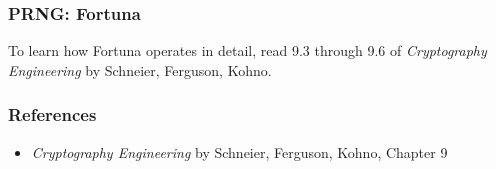 \documentclass{beamer}
\newcommand{\<}{\langle}
\renewcommand{\>}{\rangle}
\begin{document}
\begin{frame}
\frametitle{PRNG: Fortuna}

To learn how Fortuna operates in detail, read 9.3 through 9.6 of \emph{Cryptography Engineering} by Schneier, Ferguson, Kohno.
\end{frame}


\begin{frame}
\frametitle{References}

\begin{itemize}
\item \emph{Cryptography Engineering} by Schneier, Ferguson, Kohno, Chapter 9
\end{itemize}
\end{frame}
\end{document}

